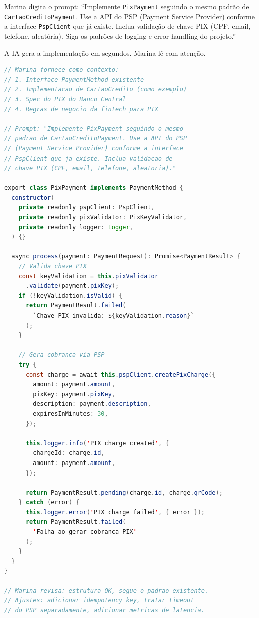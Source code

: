 Marina digita o prompt: ``Implemente \texttt{PixPayment} seguindo o mesmo padrão de
\texttt{CartaoCreditoPayment}. Use a API do PSP (Payment Service Provider) conforme a
interface \texttt{PspClient} que já existe. Inclua validação de chave PIX (CPF, email,
telefone, aleatória). Siga os padrões de logging e error handling do projeto.''

A IA gera a implementação em segundos. Marina lê com atenção.

\begin{lstlisting}[language=Java, caption={Prompt contextualizado para implementação (TypeScript)}]
// Marina fornece como contexto:
// 1. Interface PaymentMethod existente
// 2. Implementacao de CartaoCredito (como exemplo)
// 3. Spec do PIX do Banco Central
// 4. Regras de negocio da fintech para PIX

// Prompt: "Implemente PixPayment seguindo o mesmo
// padrao de CartaoCreditoPayment. Use a API do PSP
// (Payment Service Provider) conforme a interface
// PspClient que ja existe. Inclua validacao de
// chave PIX (CPF, email, telefone, aleatoria)."

export class PixPayment implements PaymentMethod {
  constructor(
    private readonly pspClient: PspClient,
    private readonly pixValidator: PixKeyValidator,
    private readonly logger: Logger,
  ) {}

  async process(payment: PaymentRequest): Promise<PaymentResult> {
    // Valida chave PIX
    const keyValidation = this.pixValidator
      .validate(payment.pixKey);
    if (!keyValidation.isValid) {
      return PaymentResult.failed(
        `Chave PIX invalida: ${keyValidation.reason}`
      );
    }

    // Gera cobranca via PSP
    try {
      const charge = await this.pspClient.createPixCharge({
        amount: payment.amount,
        pixKey: payment.pixKey,
        description: payment.description,
        expiresInMinutes: 30,
      });

      this.logger.info('PIX charge created', {
        chargeId: charge.id,
        amount: payment.amount,
      });

      return PaymentResult.pending(charge.id, charge.qrCode);
    } catch (error) {
      this.logger.error('PIX charge failed', { error });
      return PaymentResult.failed(
        'Falha ao gerar cobranca PIX'
      );
    }
  }
}

// Marina revisa: estrutura OK, segue o padrao existente.
// Ajustes: adicionar idempotency key, tratar timeout
// do PSP separadamente, adicionar metricas de latencia.
\end{lstlisting}


